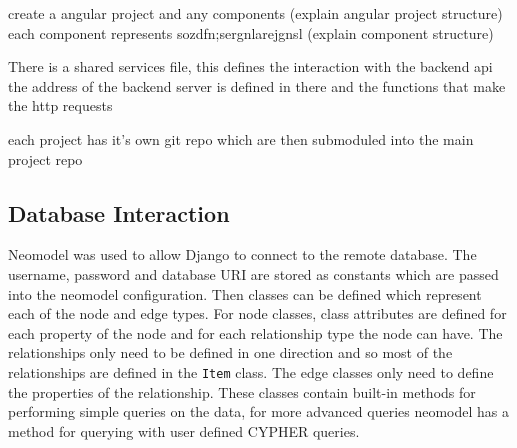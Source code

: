 create a angular project and any components
(explain angular project structure)
each component represents sozdfn;sergnlarejgnsl
(explain component structure)

There is a shared services file, this defines the interaction with the backend api
the address of the backend server is defined in there and the functions that make the http requests

each project has it's own git repo which are then submoduled into the main project repo
\subsection{Database Interaction}
Neomodel was used to allow Django to connect to the remote database. The username, password and database URI are stored as 
constants which are passed into the neomodel configuration. Then classes can be defined which represent each of the node and edge types.
For node classes, class attributes are defined for each property of the node and for each relationship type the node can have. The relationships 
only need to be defined in one direction and so most of the relationships are defined in the \verb|Item| class. The edge classes only need to 
define the properties of the relationship. These classes contain built-in methods for performing simple queries on the data, for more 
advanced queries neomodel has a method for querying with user defined CYPHER queries.
